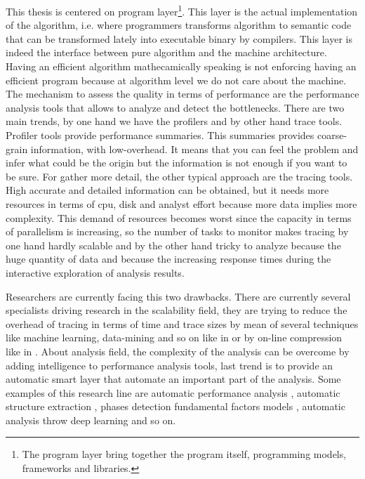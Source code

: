 This thesis is centered on program layer\footnote{The program layer 
bring together the program itself, programming models, frameworks and libraries.}. 
This layer is the actual implementation of the algorithm, i.e. where programmers
transforms algorithm to  semantic code that can be transformed lately into
executable binary by compilers. This layer is indeed the interface between pure 
algorithm and the machine architecture. Having an efficient algorithm
mathecamically speaking is not enforcing having an efficient program 
because at algorithm level we do not care about the machine. 
The mechanism to assess the quality in terms of performance are the performance 
analysis tools that allows to analyze and detect the bottlenecks. 
There are two main trends, by one hand we have the profilers and by other hand trace
tools. Profiler tools provide performance summaries. This summaries provides 
coarse-grain information, with low-overhead. It means that you can feel the problem 
and infer what could be the origin but the information is not enough if you want 
to be sure. For gather more detail, the other typical approach are the tracing 
tools. High accurate and detailed information can be obtained, but it needs 
more resources in terms of cpu, disk and analyst effort because more data implies 
more complexity. This demand of resources becomes worst since the capacity in 
terms of parallelism is increasing, so the number of tasks to monitor makes 
tracing by one hand hardly scalable and by the other hand tricky to analyze
because the huge quantity of data and because the increasing response times
during the interactive exploration of analysis results. 

Researchers are currently facing this two drawbacks. There are currently several
specialists driving research in the scalability field, they are trying to reduce 
the overhead of tracing in terms of time and trace sizes by mean of several 
techniques like machine learning, data-mining and so on like in 
\cite{llort2015intelligent} or by on-line compression like in
\cite{noeth2009scalatrace}. About analysis field, the complexity of the analysis 
can be overcome by adding intelligence to performance analysis tools, last 
trend is to provide an automatic smart layer that automate an important part 
of the analysis. Some examples of this 
research line are automatic performance analysis \cite{wolf2003automatic}, 
automatic structure extraction \cite{casas2007automatic}, phases detection 
\cite{gonzalez2013application} fundamental factors models \cite{casas2008aass}, 
automatic analysis throw deep learning \cite{simon:2017:perfdp} and so on.

